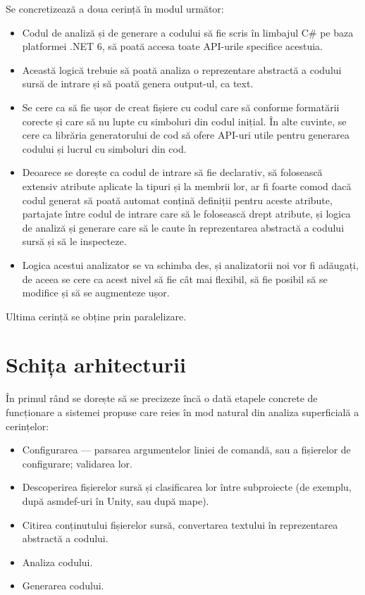 \documentclass{report}
\begin{document}
Se concretizează a doua cerință în modul următor:

\begin{itemize}
  \item Codul de analiză și de generare a codului să fie scris în limbajul C# pe baza platformei .NET 6, să poată accesa toate API-urile specifice acestuia.
  \item Această logică trebuie să poată analiza o reprezentare abstractă a codului sursă de intrare și să poată genera output-ul, ca text.
  \item Se cere ca să fie ușor de creat fișiere cu codul care să conforme formatării corecte și care să nu lupte cu simboluri din codul inițial.
  În alte cuvinte, se cere ca librăria generatorului de cod să ofere API-uri utile pentru generarea codului și lucrul cu simboluri din cod.
  \item Deoarece se dorește ca codul de intrare să fie declarativ, să folosească extensiv atribute aplicate la tipuri și la membrii lor, ar fi foarte
  comod dacă codul generat să poată automat conțină definiții pentru aceste atribute, partajate între codul de intrare care să le folosească drept atribute,
  și logica de analiză și generare care să le caute în reprezentarea abstractă a codului sursă și să le inspecteze.
  \item Logica acestui analizator se va schimba des, și analizatorii noi vor fi adăugați, de aceea se cere ca acest nivel să fie cât mai flexibil, să fie posibil să se modifice și să se augmenteze ușor.
\end{itemize}


Ultima cerință se obține prin paralelizare.

\section{Schița arhitecturii}

În primul rând se dorește să se precizeze încă o dată etapele concrete de funcționare a sistemei propuse care reies în mod natural din analiza superficială a cerințelor:

\begin{itemize}
\item Configurarea --- parsarea argumentelor liniei de comandă, sau a fișierelor de configurare; validarea lor.
\item Descoperirea fișierelor sursă și clasificarea lor între subproiecte (de exemplu, după asmdef-uri în Unity, sau după mape).
\item Citirea conținutului fișierelor sursă, convertarea textului în reprezentarea abstractă a codului.
\item Analiza codului.
\item Generarea codului.
\end{itemize}
\end{document}
